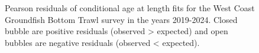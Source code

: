 \documentclass[
]{scrartcl}
\begin{document}
\begin{figure}[H]


\caption{\label{fig-peasrson-resids-age-wcgbts3}Pearson residuals of
conditional age at length fits for the West Coast Groundfish Bottom
Trawl survey in the years 2019-2024. Closed bubble are positive
residuals (observed \textgreater{} expected) and open bubbles are
negative residuals (observed \textless{} expected).}

\end{figure}%
\end{document}
